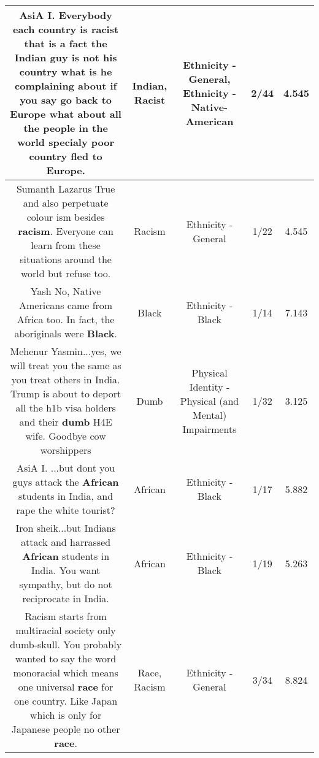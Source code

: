 \documentclass[11pt]{article}
\newlength\mylength
\begin{document}
\begin{center}
\begin{longtable}{|C{.65\mylength}|C{.30\mylength}|C{.12\mylength}|C{.12\mylength}|C{.12\mylength}|}
  \small AsiA I. Everybody each country is \textbf{racist} that is a fact the \textbf{Indian} guy is not his country what is he complaining about if you say go back to Europe what about all the people in the world specialy poor country fled to Europe.\normalsize   & Indian, Racist & Ethnicity - General, Ethnicity - Native-American & 2/44 & 4.545 \\  \hline
  \small Sumanth Lazarus True and also perpetuate colour ism besides \textbf{racism}. Everyone can learn from these situations around the world but refuse too.\normalsize   & Racism & Ethnicity - General & 1/22 & 4.545 \\  \hline
  \small Yash No, Native Americans came from Africa too. In fact, the aboriginals were \textbf{Black}.\normalsize   & Black & Ethnicity - Black & 1/14 & 7.143 \\  \hline
  \small Mehenur Yasmin...yes, we will treat you the same as you treat others in India.  Trump is about to deport all the h1b visa holders and their \textbf{dumb} H4E wife. Goodbye cow worshippers\normalsize   & Dumb & Physical Identity - Physical (and Mental) Impairments & 1/32 & 3.125 \\  \hline
  \small AsiA I. ...but dont you guys attack the \textbf{African} students in India,  and rape the white tourist?\normalsize   & African & Ethnicity - Black & 1/17 & 5.882 \\  \hline
  \small Iron sheik...but Indians attack and harrassed \textbf{African} students in India.  You want sympathy,  but do not reciprocate in India.\normalsize   & African & Ethnicity - Black & 1/19 & 5.263 \\  \hline
  \small Racism starts from multiracial society only dumb-skull. You probably wanted to say the word monoracial which means one universal \textbf{race} for one country. Like Japan which is only for Japanese people no other \textbf{race}.\normalsize   & Race, Racism & Ethnicity - General & 3/34 & 8.824 \\  \hline

\end{longtable}
\end{center}
\end{document}
